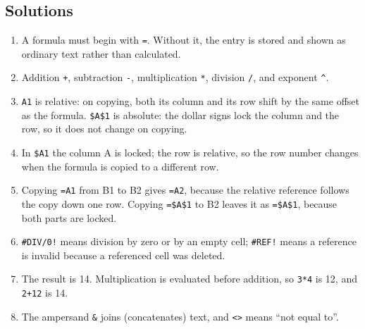 \documentclass[11pt]{article}
\begin{document}
\subsection*{Solutions}
\begingroup\small
\begin{enumerate}[label=\arabic*.]
  \item A formula must begin with \texttt{=}. Without it, the entry is stored
    and shown as ordinary text rather than calculated.
  \item Addition \texttt{+}, subtraction \texttt{-}, multiplication
    \texttt{*}, division \texttt{/}, and exponent \texttt{\textasciicircum}.
  \item \texttt{A1} is relative: on copying, both its column and its row shift
    by the same offset as the formula. \texttt{\$A\$1} is absolute: the dollar
    signs lock the column and the row, so it does not change on copying.
  \item In \texttt{\$A1} the column A is locked; the row is relative, so the
    row number changes when the formula is copied to a different row.
  \item Copying \texttt{=A1} from B1 to B2 gives \texttt{=A2}, because the
    relative reference follows the copy down one row. Copying \texttt{=\$A\$1}
    to B2 leaves it as \texttt{=\$A\$1}, because both parts are locked.
  \item \texttt{\#DIV/0!} means division by zero or by an empty cell;
    \texttt{\#REF!} means a reference is invalid because a referenced cell was
    deleted.
  \item The result is 14. Multiplication is evaluated before addition, so
    \texttt{3*4} is 12, and \texttt{2+12} is 14.
  \item The ampersand \texttt{\&} joins (concatenates) text, and \texttt{<>}
    means ``not equal to''.
\end{enumerate}
\endgroup
\end{document}
